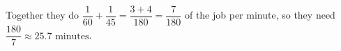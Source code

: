 Together they do $\dfrac1{60}+\dfrac1{45}=\dfrac{3+4}{180}=\dfrac7{180}$ of the job per minute, so they need $\boxed{\dfrac{180}7\approx25.7\text{ minutes}}$.
